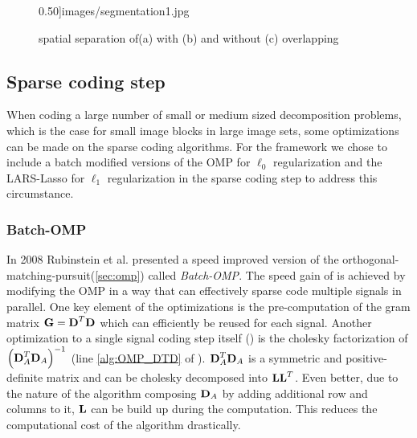 \begin{figure}[h]
{0.50]{images/segmentation1.jpg}}
\hspace{5mm}
\caption[spatial separation]{spatial separation of(a) with (b) and without (c)
overlapping}
\label{fig:separation}
\end{figure}

\subsection{Sparse coding step}
When coding a large number of small or medium sized decomposition problems,
which is the case for small image blocks in large image sets, some
optimizations can be made on the sparse coding algorithms. 
For the framework we chose to include a batch modified versions of the OMP for
$\ell_0$ regularization and the LARS-Lasso for $\ell_1$ regularization in the
sparse coding step to address this circumstance. 

\subsubsection{Batch-OMP}
In 2008 Rubinstein et al.\cite{Rubinstein2008} presented a speed improved
version of the orthogonal-matching-pursuit(\ref{sec:omp}) called
\emph{Batch-OMP}. The speed gain of  is achieved
by modifying the OMP in a way that can effectively sparse code
multiple signals in parallel. One key element of the optimizations is the
pre-computation of the gram matrix $\boldsymbol{\mathrm{G}}=\boldsymbol{\mathrm{D}}^T\boldsymbol{\mathrm{D}}$ which can
efficiently be reused for each signal. Another optimization to a single signal
coding step itself () is the cholesky factorization of
$\left( \boldsymbol{\mathrm{D}}_A^T \boldsymbol{\mathrm{D}}_A \right)^{-1}$ (line \ref{alg:OMP_DTD} of
). $\boldsymbol{\mathrm{D}}_A^T \boldsymbol{\mathrm{D}}_A$ is a symmetric and
positive-definite matrix and can be cholesky decomposed
into $\boldsymbol{\mathrm{L}}\boldsymbol{\mathrm{L}}^T$. Even better, due to the nature of the algorithm
composing $\boldsymbol{\mathrm{D}}_A$ by adding additional row and columns to it, $\boldsymbol{\mathrm{L}}$ can
be build up during the computation. This reduces the computational cost of the
algorithm drastically.


